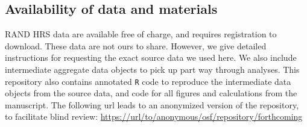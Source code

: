 \documentclass{bmcart}
\begin{document}
\subsection*{Availability of data and materials}
RAND HRS data are available free of charge, and requires  registration to download. These data are not ours to share. However, we give detailed instructions for requesting the exact source data we used here. We also include intermediate aggregate data objects to pick up part way through analyses. This repository also contains annotated \texttt{R} code to reproduce the intermediate data objects from the source data, and code for all figures and calculations from the manuscript.
The following url leads to an anonymized version of the repository, to facilitate blind review:
\url{https://url/to/anonymous/osf/repository/forthcoming}


\end{document}
